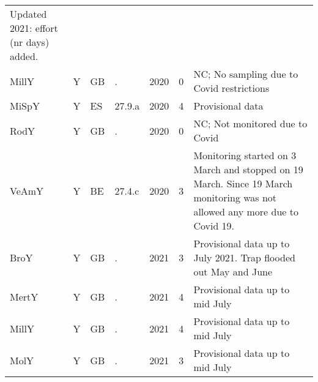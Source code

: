 \begin{table}[htbp]
\begin{tabular}{p{1.5cm}p{1.5cm}p{1.5cm}p{1cm}p{1cm}p{1cm}p{8cm}}
 Updated 2021: effort (nr days) added. \\ 
  MillY & Y & GB & . & 2020 &   0 & NC; No sampling due to Covid restrictions \\ 
  MiSpY & Y & ES & 27.9.a & 2020 &   4 & Provisional data \\ 
  RodY & Y & GB & . & 2020 &   0 & NC; Not monitored due to Covid \\ 
  VeAmY & Y & BE & 27.4.c & 2020 &   3 & Monitoring started on 3 March and stopped on 19 March. Since 19 March monitoring was not allowed any more due to Covid 19. \\ 
  BroY & Y & GB & . & 2021 &   3 & Provisional data up to July 2021. Trap flooded out May and June \\ 
  MertY & Y & GB & . & 2021 &   4 & Provisional data up to mid July \\ 
  MillY & Y & GB & . & 2021 &   4 & Provisional data up to mid July \\ 
  MolY & Y & GB & . & 2021 &   3 & Provisional data up to mid July \\ 
   \hline
\end{tabular}
\end{table}

